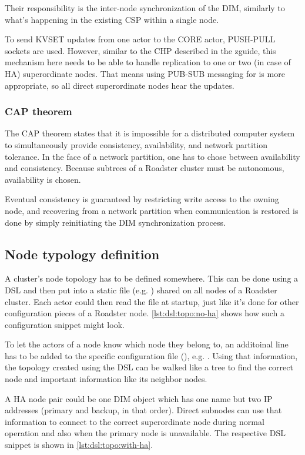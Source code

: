 Their responsibility is the inter-node synchronization of the DIM, similarly to
what's happening in the existing CSP within a single node.

To send KVSET updates from one actor to the CORE actor, PUSH-PULL sockets are
used. However, similar to the \gls{CHP} described in the \gls{zguide}, this
mechanism here needs to be able to handle replication to one or two (in case of
HA) superordinate nodes. That means using PUB-SUB messaging for is more
appropriate, so all direct superordinate nodes hear the updates.

\subsubsection{CAP theorem}
The CAP theorem \cite{wp:cap} states that it is impossible for a distributed
computer system to simultaneously provide consistency, availability, and
network partition tolerance. In the face of a network partition, one has to
chose between availability and consistency. Because subtrees of a Roadster
cluster must be autonomous, availability is chosen.

Eventual consistency is guaranteed by restricting write access to the owning
node, and recovering from a network partition when communication is restored is
done by simply reinitiating the DIM synchronization process.

\subsection{Node typology definition}
A cluster's node topology has to be defined somewhere. This can be done using a
\gls{DSL} and then put into a static file (e.g. ) shared
on all nodes of a Roadster cluster. Each actor could then read the file at
startup, just like it's done for other configuration pieces of a Roadster node.
\autoref{lst:dsl:topo:no-ha} shows how such a configuration snippet might look.

To let the actors of a node know which node they belong to, an additoinal line
has to be added to the specific configuration file (), e.g.
. Using that information, the topology
created using the DSL can be walked like a tree to find the correct node and
important information like its neighbor nodes.

A HA node pair could be one DIM object which has one name but two IP addresses
(primary and backup, in that order). Direct subnodes can use that information
to connect to the correct superordinate node during normal operation and also
when the primary node is unavailable. The respective DSL snippet is shown in
\autoref{lst:dsl:topo:with-ha}.

